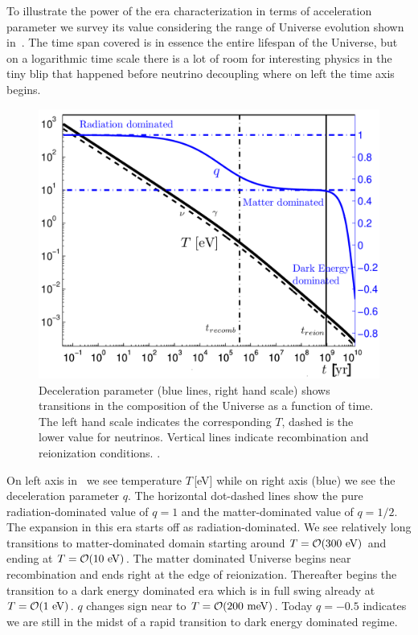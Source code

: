To illustrate the power of the era characterization in terms of acceleration parameter we survey its value considering the range of Universe evolution shown in~. The time span covered is in essence the entire lifespan of the Universe, but on a logarithmic time scale there is a lot of room for interesting physics in the tiny blip that happened before neutrino decoupling where on left the time axis begins. 

\begin{figure}
\centerline{\includegraphics[width=0.90\linewidth]{01-introduction/Figures/Tqtoday.png}}
\caption{Deceleration parameter (blue lines, right hand scale) shows transitions in the composition of the Universe as a function of time. The left hand scale indicates the corresponding $T$, dashed is the lower value for neutrinos. Vertical lines indicate recombination and reionization conditions. .
\label{fig:today} }
\end{figure}

On left axis in~ we see temperature $T$\,[eV] while on right axis (blue) we see the deceleration parameter $q$. The horizontal dot-dashed lines show the pure radiation-dominated value of $q=1$ and the matter-dominated value of $q=1/2$. The expansion in this era starts off as radiation-dominated. We see relatively long transitions to matter-dominated domain starting around $T=\mathcal{O}(300\text{ eV})$ and ending at $T=\mathcal{O}(10\text{ eV})$. The matter dominated Universe begins near recombination and ends right at the edge of reionization. Thereafter begins the transition to a dark energy dominated era which is in full swing already at $T=\mathcal{O}(1\text{ eV})$. $q$ changes sign near to $T=\mathcal{O}(200\text{ meV})$. Today $q=-0.5$ indicates we are still in the midst of a rapid transition to dark energy dominated regime. 

